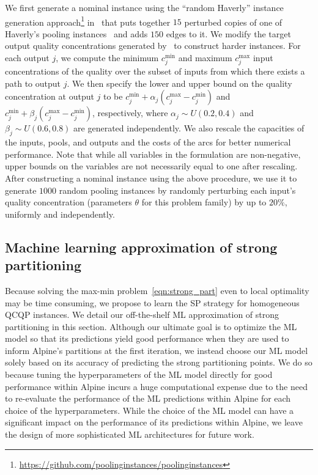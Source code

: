 \documentclass{article}
\newcommand{\pp}{partitioning points}
\begin{document}
We first generate a nominal instance using the ``random Haverly'' instance generation approach\footnote{\url{https://github.com/poolinginstances/poolinginstances}} in~\cite{luedtke2020strong} that puts together $15$ perturbed copies of one of Haverly's pooling instances~\cite{haverly1978studies} and adds $150$ edges to it.
We modify the target output quality concentrations generated by~\cite{luedtke2020strong} to construct harder instances.
For each output $j$, we compute the minimum $c^{\text{min}}_j$ and maximum $c^{\text{max}}_j$ input concentrations of the quality over the subset of inputs from which there exists a path to output $j$.
We then specify the lower and upper bound on the quality concentration at output $j$ to be $c^{\text{min}}_j + \alpha_j (c^{\text{max}}_j - c^{\text{min}}_j)$ and $c^{\text{min}}_j + \beta_j (c^{\text{max}}_j - c^{\text{min}}_j)$, respectively, where $\alpha_j \sim U(0.2,0.4)$ and $\beta_j \sim U(0.6,0.8)$ are generated independently.
We also rescale the capacities of the inputs, pools, and outputs and the costs of the arcs for better numerical performance.
Note that while all variables in the formulation are non-negative, upper bounds on the variables are not necessarily equal to one after rescaling.
After constructing a nominal instance using the above procedure, we use it to generate $1000$ random pooling instances by randomly perturbing each input's quality concentration (parameters $\theta$ for this problem family) by up to $20\%$, uniformly and independently.








\subsection{Machine learning approximation of strong partitioning}
\label{subsec:ml_approx}

Because solving the max-min problem~\eqref{eqn:strong_part} even to local optimality may be time consuming, we propose to learn the SP strategy for homogeneous QCQP instances.
We detail our off-the-shelf ML approximation of strong partitioning in this section.
Although our ultimate goal is to optimize the ML model so that its predictions yield good performance when they are used to inform Alpine's partitions at the first iteration, we instead choose our ML model solely based on its accuracy of predicting the strong {\pp}.
We do so because tuning the hyperparameters of the ML model directly for good performance within Alpine incurs a huge computational expense due to the need to re-evaluate the performance of the ML predictions within Alpine for each choice of the hyperparameters. 
While the choice of the ML model can have a significant impact on the performance of its predictions within Alpine, we leave the design of more sophisticated ML architectures for future work.
\end{document}
